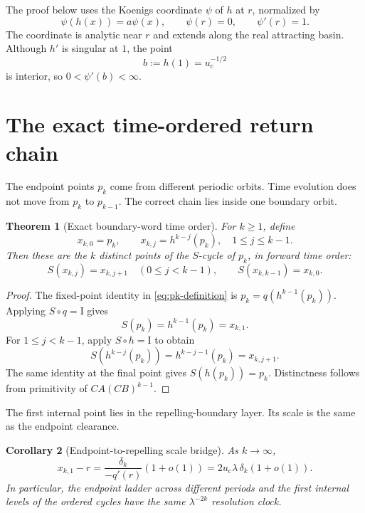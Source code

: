\documentclass[11pt]{article}
\newtheorem{theorem}{Theorem}[section]
\newtheorem{corollary}[theorem]{Corollary}
\theoremstyle{definition}
\theoremstyle{remark}
\newcommand{\uc}{u_{\mathrm c}}
\newcommand{\Id}{\mathrm I}
\begin{document}
The proof below uses the Koenigs coordinate $\psi$ of $h$ at $r$,
normalized by
\begin{equation}\label{eq:koenigs}
 \psi(h(x))=a\psi(x),
 \qquad \psi(r)=0,
 \qquad \psi'(r)=1.
\end{equation}
The coordinate is analytic near $r$ and extends along the real attracting
basin.  Although $h'$ is singular at $1$, the point
\begin{equation}\label{eq:b-definition}
 b:=h(1)=\uc^{-1/2}
\end{equation}
is interior, so $0<\psi'(b)<\infty$.

\section{The exact time-ordered return chain}
\label{sec:time-order}

The endpoint points $p_k$ come from different periodic orbits.  Time
evolution does not move from $p_k$ to $p_{k-1}$.  The correct chain lies
inside one boundary orbit.

\begin{theorem}[Exact boundary-word time order]
\label{thm:time-order}
For $k\ge1$, define
\begin{equation}\label{eq:ordered-points}
 x_{k,0}=p_k,
 \qquad
 x_{k,j}=h^{k-j}(p_k),
 \quad 1\le j\le k-1.
\end{equation}
Then these are the $k$ distinct points of the $S$-cycle of $p_k$, in forward
time order:
\begin{equation}\label{eq:cyclic-time-order}
 S(x_{k,j})=x_{k,j+1}\quad(0\le j<k-1),
 \qquad
 S(x_{k,k-1})=x_{k,0}.
\end{equation}
\end{theorem}

\begin{proof}
The fixed-point identity in \eqref{eq:pk-definition} is
$p_k=q(h^{k-1}(p_k))$.  Applying $S\circ q=\Id$ gives
\[
 S(p_k)=h^{k-1}(p_k)=x_{k,1}.
\]
For $1\le j<k-1$, apply $S\circ h=\Id$ to obtain
\[
 S(h^{k-j}(p_k))=h^{k-j-1}(p_k)=x_{k,j+1}.
\]
The same identity at the final point gives $S(h(p_k))=p_k$.  Distinctness
follows from primitivity of $CA(CB)^{k-1}$.
\end{proof}

The first internal point lies in the repelling-boundary layer.  Its scale is
the same as the endpoint clearance.

\begin{corollary}[Endpoint-to-repelling scale bridge]
\label{cor:scale-bridge}
As $k\to\infty$,
\begin{equation}\label{eq:scale-bridge}
 x_{k,1}-r
 =\frac{\delta_k}{-q'(r)}(1+o(1))
 =2\uc\lambda\,\delta_k(1+o(1)).
\end{equation}
In particular, the endpoint ladder across different periods and the first
internal levels of the ordered cycles have the same
$\lambda^{-2k}$ resolution clock.
\end{corollary}
\end{document}
